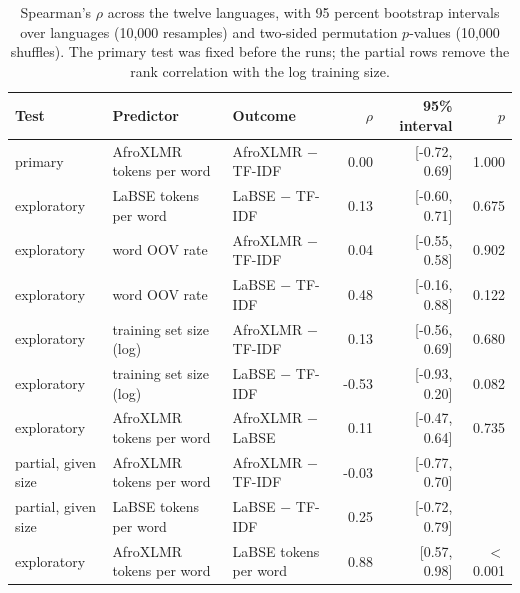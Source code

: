 \documentclass[11pt]{article}
\begin{document}
\begin{table}[t]
\centering
\footnotesize
\begin{tabular}{lllrrr}
\toprule
Test & Predictor & Outcome & $\rho$ & 95\% interval & $p$ \\
\midrule
primary & AfroXLMR tokens per word & AfroXLMR $-$ TF-IDF & 0.00 & [-0.72, 0.69] & 1.000 \\
exploratory & LaBSE tokens per word & LaBSE $-$ TF-IDF & 0.13 & [-0.60, 0.71] & 0.675 \\
exploratory & word OOV rate & AfroXLMR $-$ TF-IDF & 0.04 & [-0.55, 0.58] & 0.902 \\
exploratory & word OOV rate & LaBSE $-$ TF-IDF & 0.48 & [-0.16, 0.88] & 0.122 \\
exploratory & training set size (log) & AfroXLMR $-$ TF-IDF & 0.13 & [-0.56, 0.69] & 0.680 \\
exploratory & training set size (log) & LaBSE $-$ TF-IDF & -0.53 & [-0.93, 0.20] & 0.082 \\
exploratory & AfroXLMR tokens per word & AfroXLMR $-$ LaBSE & 0.11 & [-0.47, 0.64] & 0.735 \\
partial, given size & AfroXLMR tokens per word & AfroXLMR $-$ TF-IDF & -0.03 & [-0.77, 0.70] &  \\
partial, given size & LaBSE tokens per word & LaBSE $-$ TF-IDF & 0.25 & [-0.72, 0.79] &  \\
exploratory & AfroXLMR tokens per word & LaBSE tokens per word & 0.88 & [0.57, 0.98] & $<$0.001 \\
\bottomrule
\end{tabular}
\caption{Spearman's $\rho$ across the twelve languages, with 95 percent bootstrap intervals over languages (10,000 resamples) and two-sided permutation $p$-values (10,000 shuffles). The primary test was fixed before the runs; the partial rows remove the rank correlation with the log training size.}
\label{tab:corr}
\end{table}
\end{document}
